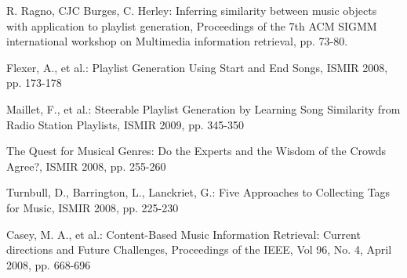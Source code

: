 \documentclass[a4paper]{article}
\begin{document}
\begin{thebibliography}{1}


R. Ragno, CJC Burges, C. Herley:
Inferring similarity between music objects with application to playlist generation,
Proceedings of the 7th ACM SIGMM international workshop on Multimedia information retrieval,
pp. 73-80.

Flexer, A., et al.: 
Playlist Generation Using Start and End Songs, 
ISMIR 2008,
pp. 173-178

Maillet, F., et al.:
Steerable Playlist Generation by Learning Song Similarity from Radio Station Playlists,
ISMIR 2009,
pp. 345-350

The Quest for Musical Genres: Do the Experts and the Wisdom of the Crowds Agree?,
ISMIR 2008,
pp. 255-260



Turnbull, D., Barrington, L., Lanckriet, G.:
Five Approaches to Collecting Tags for Music,
ISMIR 2008,
pp. 225-230

Casey, M. A., et al.:
Content-Based Music Information Retrieval: Current directions and Future Challenges,
Proceedings of the IEEE, Vol 96, No. 4, April 2008,
pp. 668-696





\end{thebibliography} 
\end{document}
